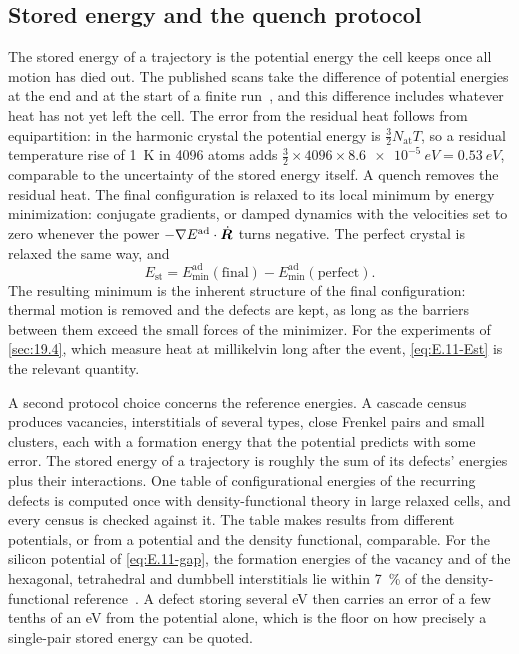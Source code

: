 \subsection{Stored energy and the quench protocol}

The stored energy of a trajectory is the potential energy the cell keeps once all motion has died out. The published scans take the difference of potential energies at the end and at the start of a finite run~\cite[Sect.~II\,A]{sassi2022energy}, and this difference includes whatever heat has not yet left the cell. The error from the residual heat follows from equipartition: in the harmonic crystal the potential energy is $\tfrac32N_{\mathrm{at}}T$, so a residual temperature rise of \SI{1}{K} in 4096 atoms adds $\tfrac32\times4096\times\SI{8.6e-5}{eV} = \SI{0.53}{eV}$, comparable to the uncertainty of the stored energy itself. A quench removes the residual heat. The final configuration is relaxed to its local minimum by energy minimization: conjugate gradients, or damped dynamics with the velocities set to zero whenever the power $-\nabla E^{\mathrm{ad}}\cdot\dot{\bm{R}}$ turns negative. The perfect crystal is relaxed the same way, and
\begin{equation}
  E_{\mathrm{st}} = E^{\mathrm{ad}}_{\mathrm{min}}(\text{final}) - E^{\mathrm{ad}}_{\mathrm{min}}(\text{perfect}) .
  \label{eq:E.11-Est}
\end{equation}
The resulting minimum is the inherent structure of the final configuration: thermal motion is removed and the defects are kept, as long as the barriers between them exceed the small forces of the minimizer. For the experiments of \cref{sec:19.4}, which measure heat at millikelvin long after the event, \cref{eq:E.11-Est} is the relevant quantity.

A second protocol choice concerns the reference energies. A cascade census produces vacancies, interstitials of several types, close Frenkel pairs and small clusters, each with a formation energy that the potential predicts with some error. The stored energy of a trajectory is roughly the sum of its defects' energies plus their interactions. One table of configurational energies of the recurring defects is computed once with density-functional theory in large relaxed cells, and every census is checked against it. The table makes results from different potentials, or from a potential and the density functional, comparable. For the silicon potential of \cref{eq:E.11-gap}, the formation energies of the vacancy and of the hexagonal, tetrahedral and dumbbell interstitials lie within \SI{7}{\percent} of the density-functional reference~\cite[Sect.~III\,E]{bartok2018machine}. A defect storing several eV then carries an error of a few tenths of an eV from the potential alone, which is the floor on how precisely a single-pair stored energy can be quoted.

